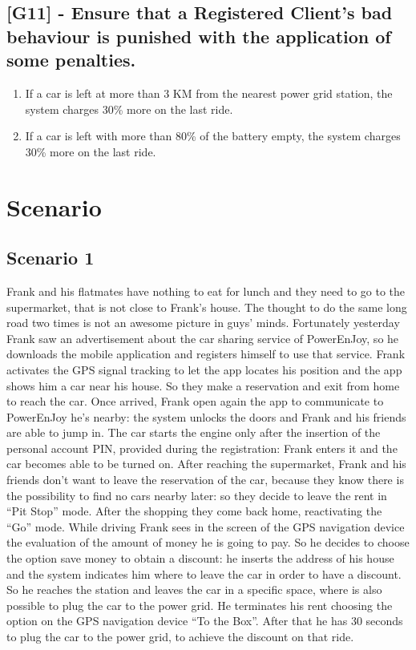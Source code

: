 \subsection{[G11] - Ensure that a Registered Client’s bad behaviour is punished with the application of some penalties.}
\begin{enumerate}[label=\textbf{R11.\arabic*)}]
\item If a car is left at more than 3 KM from the nearest power grid station, the system charges 30\% more on the last ride.
\item If a car is left with more than 80\% of the battery empty, the system charges 30\% more on the last ride.
\end{enumerate}
\section{Scenario}
\subsection{Scenario 1}
Frank and his flatmates have nothing to eat for lunch and they need to go to the supermarket, that is not close to Frank’s house.
The thought to do the same long road two times is not an awesome picture in guys’ minds.
Fortunately yesterday Frank saw an advertisement about the car sharing service of PowerEnJoy, so he downloads the mobile application and registers himself to use that service.
Frank activates the GPS signal tracking to let the app locates his position and the app shows him a car near his house.
So they make a reservation and exit from home to reach the car.
Once arrived, Frank open again the app to communicate to PowerEnJoy he’s nearby: the system unlocks the doors and Frank and his friends are able to jump in.
The car starts the engine only after the insertion of the personal account PIN, provided during the registration: Frank enters it and the car becomes able to be turned on.
After reaching the supermarket, Frank and his friends don’t want to leave the reservation of the car, because they know there is the possibility to find no cars nearby later: so they decide to leave the rent in “Pit Stop” mode.
After the shopping they come back home, reactivating the “Go” mode.
While driving Frank sees in the screen of the GPS navigation device the evaluation of the amount of money he is going to pay.
So he decides to choose the option save money to obtain a discount: he inserts the address of his house and the system indicates him where to leave the car in order to have a discount.
So he reaches the station and leaves the car in a specific space, where is also possible to plug the car to the power grid.
He terminates his rent choosing the option on the GPS navigation device  “To the Box”.
After that he has 30 seconds to plug the car to the power grid, to achieve the discount on that ride.

